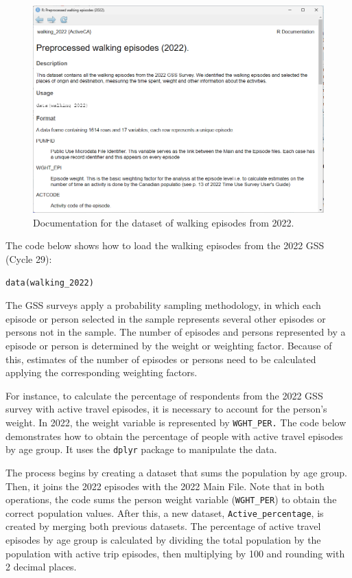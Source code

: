 \documentclass[Royal,times,sageh]{sagej}
\begin{document}
\begin{figure}

{\centering \includegraphics[width=1\linewidth]{Manuscript-figures/walking-2022-documentation} 

}

\caption{Documentation for the dataset of walking episodes from 2022.}\label{fig:walking_documentation}
\end{figure}

The code below shows how to load the walking episodes from the 2022 GSS
(Cycle 29):

\begin{verbatim}
data(walking_2022)
\end{verbatim}

The GSS surveys apply a probability sampling methodology, in which each
episode or person selected in the sample represents several other
episodes or persons not in the sample. The number of episodes and
persons represented by a episode or person is determined by the weight
or weighting factor. Because of this, estimates of the number of
episodes or persons need to be calculated applying the corresponding
weighting factors.

For instance, to calculate the percentage of respondents from the 2022
GSS survey with active travel episodes, it is necessary to account for
the person's weight. In 2022, the weight variable is represented by
\texttt{WGHT\_PER.} The code below demonstrates how to obtain the
percentage of people with active travel episodes by age group. It uses
the \texttt{dplyr} package \citep{dplyr2023} to manipulate the data.

The process begins by creating a dataset that sums the population by age
group. Then, it joins the 2022 episodes with the 2022 Main File. Note
that in both operations, the code sums the person weight variable
(\texttt{WGHT\_PER}) to obtain the correct population values. After
this, a new dataset, \texttt{Active\_percentage}, is created by merging
both previous datasets. The percentage of active travel episodes by age
group is calculated by dividing the total population by the population
with active trip episodes, then multiplying by 100 and rounding with 2
decimal places.
\end{document}
